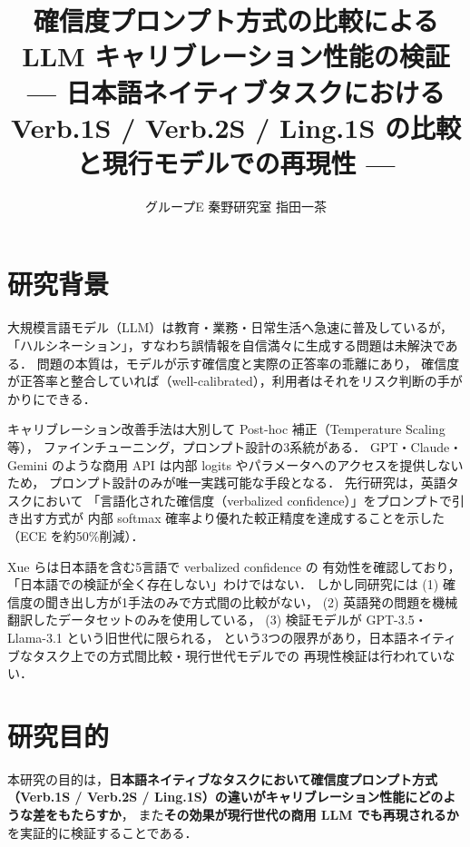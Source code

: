 \documentclass[10pt,a4paper,twocolumn]{article}
\title{\large\bfseries 確信度プロンプト方式の比較による LLM キャリブレーション性能の検証\\
{\normalsize --- 日本語ネイティブタスクにおける Verb.1S / Verb.2S / Ling.1S の比較と現行モデルでの再現性 ---}}
\author{\normalsize グループE \quad 秦野研究室 \quad 7422048 \quad 指田一茶}
\date{}
\begin{document}
\maketitle
\thispagestyle{empty}

\section{研究背景}

大規模言語モデル（LLM）は教育・業務・日常生活へ急速に普及しているが，
「ハルシネーション」，すなわち誤情報を自信満々に生成する問題は未解決である\cite{ji2023survey}．
問題の本質は，モデルが示す確信度と実際の正答率の乖離にあり，
確信度が正答率と整合していれば（well-calibrated），利用者はそれをリスク判断の手がかりにできる．

キャリブレーション改善手法は大別して Post-hoc 補正（Temperature Scaling 等），
ファインチューニング，プロンプト設計の3系統がある．
GPT・Claude・Gemini のような商用 API は内部 logits やパラメータへのアクセスを提供しないため，
プロンプト設計のみが唯一実践可能な手段となる\cite{xie2024blackboxsurvey}．
先行研究\cite{tian2023just,xiong2024can}は，英語タスクにおいて
「言語化された確信度（verbalized confidence）」をプロンプトで引き出す方式が
内部 softmax 確率より優れた較正精度を達成することを示した（ECE を約50\%削減）．

Xue ら\cite{xue2025mlingconf}は日本語を含む5言語で verbalized confidence の
有効性を確認しており，「日本語での検証が全く存在しない」わけではない．
しかし同研究には (1) 確信度の聞き出し方が1手法のみで方式間の比較がない，
(2) 英語発の問題を機械翻訳したデータセットのみを使用している，
(3) 検証モデルが GPT-3.5・Llama-3.1 という旧世代に限られる，
という3つの限界があり，日本語ネイティブなタスク上での方式間比較・現行世代モデルでの
再現性検証は行われていない．

\section{研究目的}

本研究の目的は，\textbf{日本語ネイティブなタスクにおいて確信度プロンプト方式
（Verb.1S / Verb.2S / Ling.1S）の違いがキャリブレーション性能にどのような差をもたらすか}，
また\textbf{その効果が現行世代の商用 LLM でも再現されるか}を実証的に検証することである．
\end{document}
